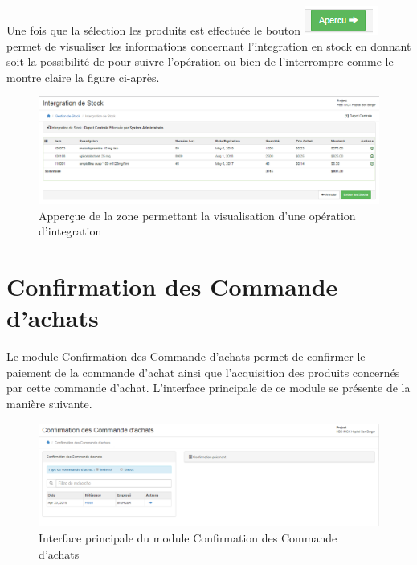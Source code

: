 \documentclass[12pt,a4paper]{report}
\begin{document}
Une fois que la sélection les produits est effectuée le bouton \includegraphics[scale=0.7]{pic/ApercIntegration.png} permet de visualiser les informations concernant l'integration en stock en donnant soit la possibilité de pour suivre l'opération ou bien de l'interrompre comme le montre claire la figure ci-après.

\begin{figure}[h]
\begin{center}
\includegraphics[width=12cm]{pic/ValidationIntegration.png}
\end{center}
\caption{Apperçue de la zone permettant la visualisation d'une opération d'integration}
\label{Apperçue de la zone permettant la visualisation d'une opération d'integration}
\end{figure} 


\newpage
\section{Confirmation des Commande d'achats}
Le module Confirmation des Commande d'achats permet de confirmer le paiement de la commande d'achat ainsi que l'acquisition des produits concernés par cette commande d'achat. L'interface principale de ce module se présente de la manière suivante.

\begin{figure}[h]
\begin{center}
\includegraphics[width=12cm]{pic/ConfPaieAchat.png}
\end{center}
\caption{Interface principale du module Confirmation des Commande d'achats}
\label{Interface principale du module Confirmation des Commande d'achats}
\end{figure}  
\end{document}
